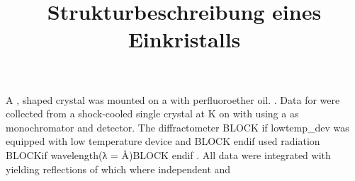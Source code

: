\documentclass[11pt,a4paper,twocolumn]{article}
\title{\textbf{Strukturbeschreibung eines Einkristalls}}
\begin{document}
    \maketitle


    A {}, {} shaped crystal was mounted on
    a {}
    with perfluoroether oil. {}. Data for {}
    were collected from a shock-cooled single crystal at  K
    on {}
        {} {} with {} {}
    using a {} as monochromator and {} {}
    detector. The diffractometer
        BLOCK{ if lowtemp_dev }was equipped with {} {}
        low temperature device and
            BLOCK{  endif }
            used {} radiation BLOCK{if wavelength}(λ = {} Å)BLOCK{  endif }.
                All data were integrated with {} yielding {}
                reflections of which {} where independent and
\end{document}
